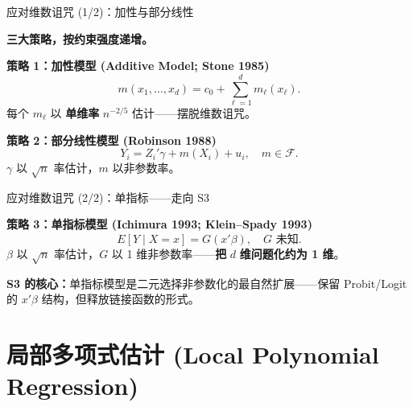 \documentclass[aspectratio=169, 10pt]{beamer}
\begin{document}
\begin{frame}{应对维数诅咒 (1/2)：加性与部分线性}

  \begin{highlightbox}
    \textbf{三大策略，按约束强度递增。}
  \end{highlightbox}

  \textbf{策略 1：加性模型 (Additive Model; Stone 1985)}
  \[
    m(x_1,\ldots,x_d) = c_0 + \sum_{\ell=1}^d m_\ell(x_\ell).
  \]
  每个 $m_\ell$ 以 \textbf{单维率} $n^{-2/5}$ 估计——摆脱维数诅咒。

  \textbf{策略 2：部分线性模型 (Robinson 1988)}
  \[
    Y_i = Z_i'\gamma + m(X_i) + u_i,\quad m\in\mathcal{F}.
  \]
  $\gamma$ 以 $\sqrt{n}$ 率估计，$m$ 以非参数率。

\end{frame}


\begin{frame}{应对维数诅咒 (2/2)：单指标——走向 S3}

  \textbf{策略 3：单指标模型 (Ichimura 1993; Klein--Spady 1993)}
  \[
    E[Y\mid X=x] = G(x'\beta),\quad G \text{ 未知}.
  \]
  $\beta$ 以 $\sqrt{n}$ 率估计，$G$ 以 1 维非参数率——\textbf{把 }$d$\textbf{ 维问题化约为 1 维}。

  \begin{keybox}
    \textbf{S3 的核心：}单指标模型是二元选择非参数化的最自然扩展——保留 Probit/Logit 的 $x'\beta$ 结构，但释放链接函数的形式。
  \end{keybox}

\end{frame}



\section{局部多项式估计 (Local Polynomial Regression)}
\end{document}
